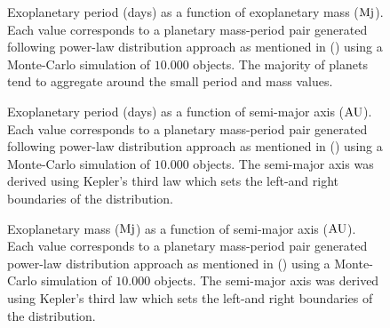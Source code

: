 \begin{figure}[!ht]
\centering
\caption{\scriptsize{Exoplanetary period (days) as a function of exoplanetary mass ($\textnormal{Mj}$). Each value corresponds to a planetary mass-period pair generated following power-law distribution approach as mentioned in  (\citeyear{2010EAS....41..107N}) using a Monte-Carlo simulation of $10.000$ objects. The majority of planets tend to aggregate around the small period and mass values. %
}}
\label{fig:PeriodMass_Nielsen}
\end{figure}

\begin{figure}[!ht]
\centering
\caption{\scriptsize{Exoplanetary period (days) as a function of semi-major axis ($\textnormal{AU}$). Each value corresponds to a planetary mass-period pair generated following power-law distribution approach as mentioned in  (\citeyear{2010EAS....41..107N}) using a Monte-Carlo simulation of $10.000$ objects. The semi-major axis was derived using Kepler's third law which sets the left-and right boundaries of the distribution. %
}}
\label{fig:PeriodMajor_Nielsen}
\end{figure}

\begin{figure}[!ht]
\centering
\caption{\scriptsize{Exoplanetary mass ($\textnormal{Mj}$) as a function of semi-major axis ($\textnormal{AU}$). Each value corresponds to a planetary mass-period pair generated power-law distribution approach as mentioned in  (\citeyear{2010EAS....41..107N}) using a Monte-Carlo simulation of $10.000$ objects. The semi-major axis was derived using Kepler's third law which sets the left-and right boundaries of the distribution. %
}}
\label{fig:MassMajor_Nielsen}
\end{figure}

